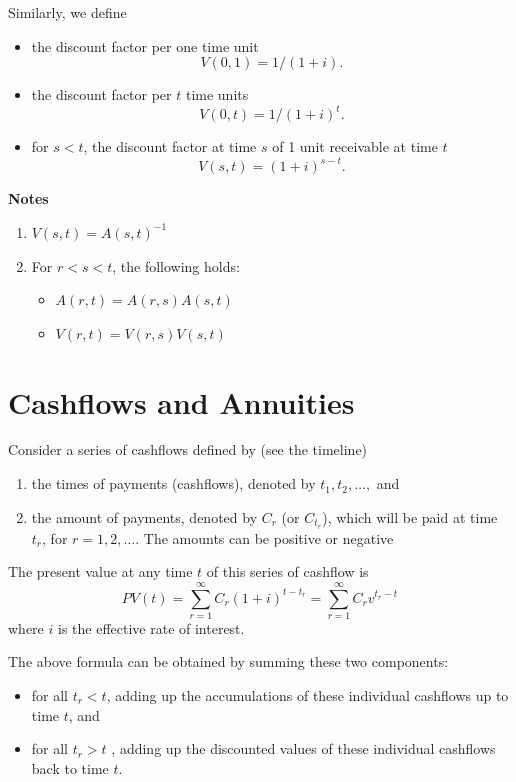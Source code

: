 \documentclass[
]{book}
\theoremstyle{definition}
\theoremstyle{definition}
\theoremstyle{definition}
\theoremstyle{definition}
\theoremstyle{remark}
\begin{document}
Similarly, we define

\begin{itemize}
\item
  the discount factor per one time unit \[V(0,1) = 1/(1 + i).\]
\item
  the discount factor per \(t\) time units \[V(0,t) = 1/(1 + i)^t.\]
\item
  for \(s < t\), the discount factor at time \(s\) of 1 unit receivable at
  time \(t\) \[V(s,t) =  (1 + i)^{s - t}.\]
\end{itemize}

\textbf{Notes}

\begin{enumerate}
\def\labelenumi{\arabic{enumi}.}
\item
  \(V(s,t) = A(s,t)^{-1}\)
\item
  For \(r < s < t\), the following holds:

  \begin{itemize}
  \item
    \(A(r,t) = A(r,s) A(s,t)\)
  \item
    \(V(r,t) = V(r,s) V(s,t)\)
  \end{itemize}
\end{enumerate}

\section{Cashflows and Annuities}\label{cashflows-and-annuities}

Consider a series of cashflows defined by (see the timeline)

\begin{enumerate}
\def\labelenumi{\arabic{enumi}.}
\item
  the times of payments (cashflows), denoted by \(t_1, t_2, \ldots,\)
  and
\item
  the amount of payments, denoted by \(C_{r}\) (or \(C_{t_r}\)), which
  will be paid at time \(t_r\), for \(r = 1,2, \ldots\). The amounts can
  be positive or negative
\end{enumerate}

The present value at any time \(t\) of this series of cashflow is
\[PV(t) = \sum_{r=1}^\infty C_r (1 + i)^{t - t_r} = \sum_{r=1}^\infty C_r v^{t _r - t}\]
where \(i\) is the effective rate of interest.

The above formula can be obtained by summing these two components:

\begin{itemize}
\item
  for all \(t_r < t\), adding up the accumulations of these individual
  cashflows up to time \(t\), and
\item
  for all \(t_r > t\) , adding up the discounted values of these
  individual cashflows back to time \(t\).
\end{itemize}
\end{document}
